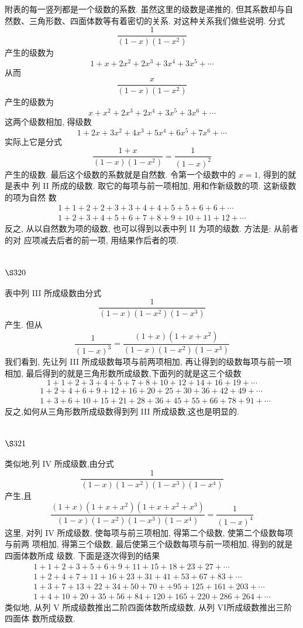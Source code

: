 附表的每一竖列都是一个级数的系数. 虽然这里的级数是递推的, 但其系数却与自 然数、三角形数、四面体数等有着密切的关系. 对这种关系我们做些说明. 分式
\[
\frac{1}{(1-x)\left(1-x^{2}\right)}
\]
产生的级数为
\[
1+x+2 x^{2}+2 x^{3}+3 x^{4}+3 x^{5}+\cdots
\]
从而
\[
\frac{x}{(1-x)\left(1-x^{2}\right)}
\]
产生的级数为
\[
x+x^{2}+2 x^{3}+2 x^{4}+3 x^{5}+3 x^{6}+\cdots
\]
这两个级数相加, 得级数
\[
1+2 x+3 x^{2}+4 x^{3}+5 x^{4}+6 x^{5}+7 x^{6}+\cdots
\]
实际上它是分式
\[
\frac{1+x}{(1-x)\left(1-x^{2}\right)}=\frac{1}{(1-x)^{2}}
\]
产生的级数. 最后这个级数的系数就是自然数. 令第一个级数中的 $x=1$, 得到的就是表中 列 II 所成的级数. 取它的每项与前一项相加, 用和作新级数的项. 这新级数的项为自然 数
\[
\begin{gathered}
1+1+2+2+3+3+4+4+5+5+6+6+\cdots \\
1+2+3+4+5+6+7+8+9+10+11+12+\cdots
\end{gathered}
\]
反之, 从以自然数为项的级数, 也可以得到以表中列 II 为项的级数. 方法是: 从前者的对 应项减去后者的前一项, 用结果作后者的项.

\section{$\S 320$}

表中列 III 所成级数由分式
\[
\frac{1}{(1-x)\left(1-x^{2}\right)\left(1-x^{3}\right)}
\]
产生. 但从
\[
\frac{1}{(1-x)^{3}}=\frac{(1+x)\left(1+x+x^{2}\right)}{(1-x)\left(1-x^{2}\right)\left(1-x^{3}\right)}
\]
我们看到, 先让列 III 所成级数每项与前两项相加, 再让得到的级数每项与前一项相加, 最后得到的就是三角形数所成级数,下面列的就是这三个级数
\[
1+1+2+3+4+5+7+8+10+12+14+16+19+\cdots
\]
\[
\begin{aligned}
& 1+2+4+6+9+12+16+20+25+30+36+42+49+\cdots \\
& 1+3+6+10+15+21+28+36+45+55+66+78+91+\cdots
\end{aligned}
\]
反之,如何从三角形数所成级数得到列 III 所成级数,这也是明显的.

\section{$\S 321$}

类似地,列 IV 所成级数,由分式
\[
\frac{1}{(1-x)\left(1-x^{2}\right)\left(1-x^{3}\right)\left(1-x^{4}\right)}
\]
产生,且
\[
\frac{(1+x)\left(1+x+x^{2}\right)\left(1+x+x^{2}+x^{3}\right)}{(1-x)\left(1-x^{2}\right)\left(1-x^{3}\right)\left(1-x^{4}\right)}=\frac{1}{(1-x)^{4}}
\]
这里, 对列 IV 所成级数, 使每项与前三项相加, 得第二个级数, 使第二个级数每项与前两 项相加, 得第三个级数, 最后使第三个级数每项与前一项相加, 得到的就是四面体数所成 级数. 下面是逐次得到的结果
\[
\begin{gathered}
1+1+2+3+5+6+9+11+15+18+23+27+\cdots \\
1+2+4+7+11+16+23+31+41+53+67+83+\cdots \\
1+3+7+13+22+34+50+70++95+125+161+203+\cdots \\
1+4+10+20+35+56+84+120+165+220+286+264+\cdots
\end{gathered}
\]
类似地, 从列 $\mathrm{V}$ 所成级数推出二阶四面体数所成级数, 从列 VI所成级数推出三阶四面体 数所成级数.

